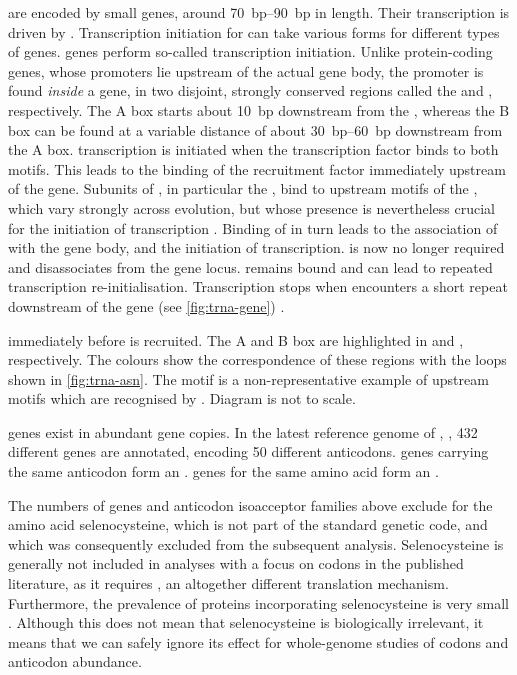 \trna[s] are encoded by small genes, around \SIrange{70}{90}{bp} in length.
Their transcription is driven by . Transcription initiation for  can
take various forms for different types of genes. \trna genes perform so-called
  transcription initiation. Unlike protein-coding
genes, whose promoters lie upstream of the actual gene body, the promoter is
found \emph{inside} a \trna gene, in two disjoint, strongly conserved regions
called the  and , respectively. The A box starts
about \SI{10}{bp} downstream from the \tss, whereas the B box can be found at a
variable distance of about \SIrange{30}{60}{bp} downstream from the A box. \trna
transcription is initiated when the transcription factor \tfiiic binds to both
motifs. This leads to the binding of the  recruitment factor \tfiiib
immediately upstream of the \trna gene. Subunits of \tfiiib, in particular the
\tbp, bind to upstream motifs of the \trna, which vary strongly across
evolution, but whose presence is nevertheless crucial for the initiation of
transcription \citep{Palida:1993,White:1992}. Binding of \tfiiib in turn leads
to the association of  with the gene body, and the initiation of
transcription. \tfiiic is now no longer required and disassociates from the gene
locus. \tfiiib remains bound and can lead to repeated transcription
re-initialisation. Transcription stops when  encounters a short \nT repeat
downstream of the \trna gene (see \cref{fig:trna-gene})
\citep{White:1998,Dieci:2007}.

    {immediately before  is recruited. The A and B box are highlighted in
    \primaryname{} and \secondaryname{}, respectively. The colours show the
    correspondence of these regions with the loops shown in \cref{fig:trna-asn}.
    The  motif is a non-representative example of upstream motifs
    which are recognised by . Diagram is not to scale.}

\trna genes exist in abundant gene copies. In the latest reference genome of
\mmu,  \citep{Church:2009}, \num{432} different \trna genes are
annotated, encoding \num{50} different anticodons. \trna genes carrying the same
anticodon form an . \trna genes for the
same amino acid form an .

The numbers of \trna genes and anticodon isoacceptor families above exclude
\trna[s] for the amino acid selenocysteine, which is not part of the standard
genetic code, and which was consequently excluded from the subsequent analysis.
Selenocysteine is generally not included in analyses with a focus on codons in
the published literature, as it requires , an
altogether different translation mechanism. Furthermore, the prevalence of
proteins incorporating selenocysteine is very small \citep{Reeves:2009}.
Although this does not mean that selenocysteine is biologically irrelevant, it
means that we can safely ignore its effect for whole-genome studies of codons
and anticodon abundance.

